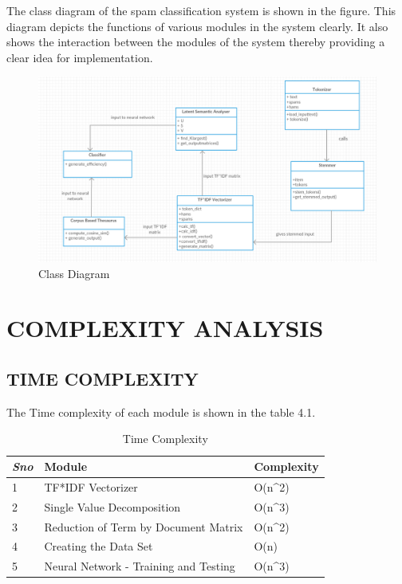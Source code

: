 The class diagram of the spam classification system is shown in the figure. This diagram depicts the functions of various modules in the system clearly. It also shows the interaction between the modules of the system thereby providing a clear idea for implementation.

\begin{figure}[h]
\centering\includegraphics[width=1.0\linewidth]{class.png}
\caption{Class Diagram}
\end{figure}

\section{COMPLEXITY ANALYSIS}
\subsection{TIME COMPLEXITY}
The Time complexity of each module is shown in the table 4.1.

\begin{table}[]
\centering
\caption{Time Complexity}
\label{my-label}
\begin{tabular}{|l|l|l|}
\hline
\textit{\textbf{Sno}} & \textbf{Module}                       & \textbf{Complexity}    \\ \hline
1                     & TF*IDF Vectorizer                     & O(n\textasciicircum 2) \\ \hline
2                     & Single Value Decomposition            & O(n\textasciicircum 3) \\ \hline
3                     & Reduction of Term by Document Matrix  & O(n\textasciicircum 2) \\ \hline
4                     & Creating the Data Set                 & O(n)                   \\ \hline
5                     & Neural Network - Training and Testing & O(n\textasciicircum 3) \\ \hline
\end{tabular}
\end{table}


